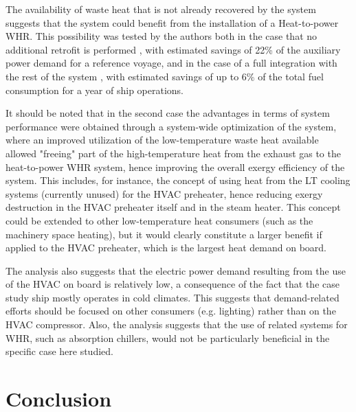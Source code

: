 \documentclass[preprint,12pt]{elsarticle}
\begin{document}
The availability of waste heat that is not already recovered by the system suggests that the system could benefit from the installation of a Heat-to-power WHR. This possibility was tested by the authors both in the case that no additional retrofit is performed \cite{Ahlgren2016,Mondejar2017}, with estimated savings of 22\% of the auxiliary power demand for a reference voyage, and in the case of a full integration with the rest of the system \cite{Baldi2017}, with estimated savings of up to 6\% of the total fuel consumption for a year of ship operations. 

It should be noted that in the second case the advantages in terms of system performance were obtained through a system-wide optimization of the system, where an improved utilization of the low-temperature waste heat available allowed "freeing" part of the high-temperature heat from the exhaust gas to the heat-to-power WHR system, hence improving the overall exergy efficiency of the system. This includes, for instance, the concept of using heat from the LT cooling systems (currently unused) for the HVAC preheater, hence reducing exergy destruction in the HVAC preheater itself and in the steam heater. This concept could be extended to other low-temperature heat consumers (such as the machinery space heating), but it would clearly constitute a larger benefit if applied to the HVAC preheater, which is the largest heat demand on board. 

The analysis also suggests that the electric power demand resulting from the use of the HVAC on board is relatively low, a consequence of the fact that the case study ship mostly operates in cold climates. This suggests that demand-related efforts should be focused on other consumers (e.g. lighting) rather than on the HVAC compressor. Also, the analysis suggests that the use of related systems for WHR, such as absorption chillers, would not be particularly beneficial in the specific case here studied. 



\section{Conclusion} \label{sec:conclusion}
\end{document}
